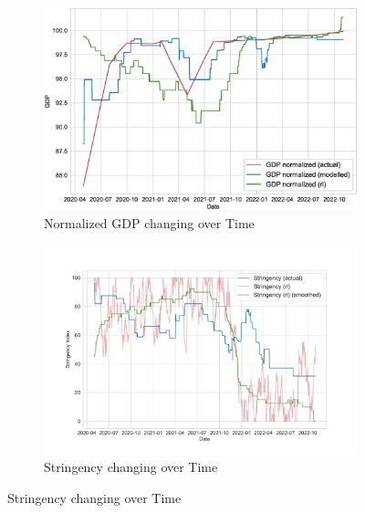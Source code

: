 \documentclass[tikz,fleqn,12pt]{wlscirep}
\begin{document}
\begin{figure}[htbp!]
  \begin{subfigure}[t]{0.48\textwidth}
    \centering
    \includegraphics[width=\linewidth]{images/244620/rl_gdp.eps}
    \caption{Normalized GDP changing over Time}
  \end{subfigure}
  \label{fig:244620_rl_gdp}
  \hfill
  \begin{subfigure}[t]{0.48\textwidth}
    \centering
    \includegraphics[width=\linewidth]{images/244620/rl_stringency.pdf}
    \caption{Stringency changing over Time}
  \end{subfigure}
  \label{fig:244620_rl_stringency}


\end{figure}
\end{document}
